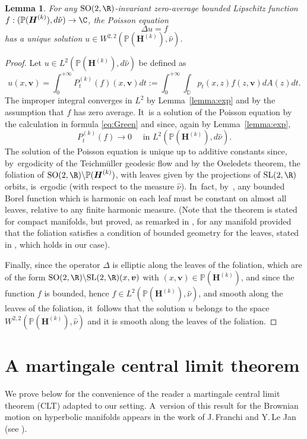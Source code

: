 \documentclass[JEP,XML,SOM,Unicode,published]{cedram}
\theoremstyle{plain}
\newtheorem{lemma}[thm]{Lemma}
\theoremstyle{definition}
\numberwithin{equation}{subsection}
\newcommand\bD{\mathbb{D}}
\newcommand\bP{\mathbb{P}}
\newcommand{\SL}{\mathrm{SL}}
\newcommand{\SO}{\mathrm{SO}}
\let\laplacian\Delta
\newcommand{\bfH}{\boldsymbol{H}}
\newcommand{\bfv}{\boldsymbol{v}}
\begin{document}
\begin{lemma}\label{lemma:Poisson} For any $\SO(2, \R)$-invariant zero-average bounded Lipschitz function $f:(\bP(\bfH^{(k)}), d\hat{\nu}) \to \C$, the Poisson equation
\[
\laplacian u = f
\]
has a unique solution $u \in W^{2,2}(\bP(\bfH^{(k)}), \hat \nu)$.
\end{lemma}
\begin{proof}
Let $u \in L^2(\bP(\bfH^{(k)}), d\hat{\nu})$ be defined as
\[
u(x,\bfv) = \int_0^{+\infty} P^{(k)}_t(f) (x,\bfv) dt := \int_0^{+\infty} \int_{\bD} p_t(x,z) f(z,\bfv) dA(z) dt.
\]
The improper integral converges in $L^2$ by Lemma~\ref{lemma:exp} and by the assumption that $f$
has zero average. It~is a solution of the Poisson equation by the calculation in formula \eqref{eq:Green}
and since, again by Lemma~\ref{lemma:exp},
\[
P^{(k)}_t(f) \to 0 \quad \text{ in } L^2(\bP(\bfH^{(k)}), d\hat{\nu}).
\]
The solution of the Poisson equation is unique up to additive constants since, by~ergodicity of the Teichmüller geodesic flow and by the Oseledets theorem, the foliation of $\SO(2, \R) \backslash \bP(\bfH^{(k)})$, with leaves given by the projections of $\SL(2, \R)$ orbits, is~ergodic (with respect to the measure $\hat \nu$). In~fact, by~\cite[Th.\,1(b)]{Gar83}, any bounded Borel function which is harmonic on each leaf must be constant on almost all leaves, relative to any finite harmonic measure. (Note that the theorem is stated for compact manifolds, but proved, as remarked in \cite{Gar83}, for
any manifold provided that the foliation satisfies a condition of bounded geometry for the leaves, stated in \hbox{\cite[\S 2]{Gar83}}, which holds in our case).

Finally, since the operator $\laplacian$ is elliptic along the leaves of the foliation, which are of the form $\SO(2, \R) \backslash \SL(2, \R) (x,\bfv)$ with $(x,\bfv)\in \bP(\bfH^{(k)})$, and since the function $f$ is bounded, hence $f \in L^2 (\bP(\bfH^{(k)}), \hat \nu)$, and smooth along the leaves of the foliation, it~follows that the solution $u$ belongs to the space $W^{2,2}(\bP(\bfH^{(k)}), \hat \nu)$ and it is smooth along the leaves of the foliation.
\end{proof}

\section{A martingale central limit theorem}

We prove below for the convenience of the reader a
martingale central limit theorem (CLT) adapted to our setting. A~version of this result for the Brownian motion on hyperbolic manifolds appears in the work of J.\,Franchi and Y.\,Le Jan (see \cite[Lem.\,VIII.7.4]{FL12}).
\end{document}
